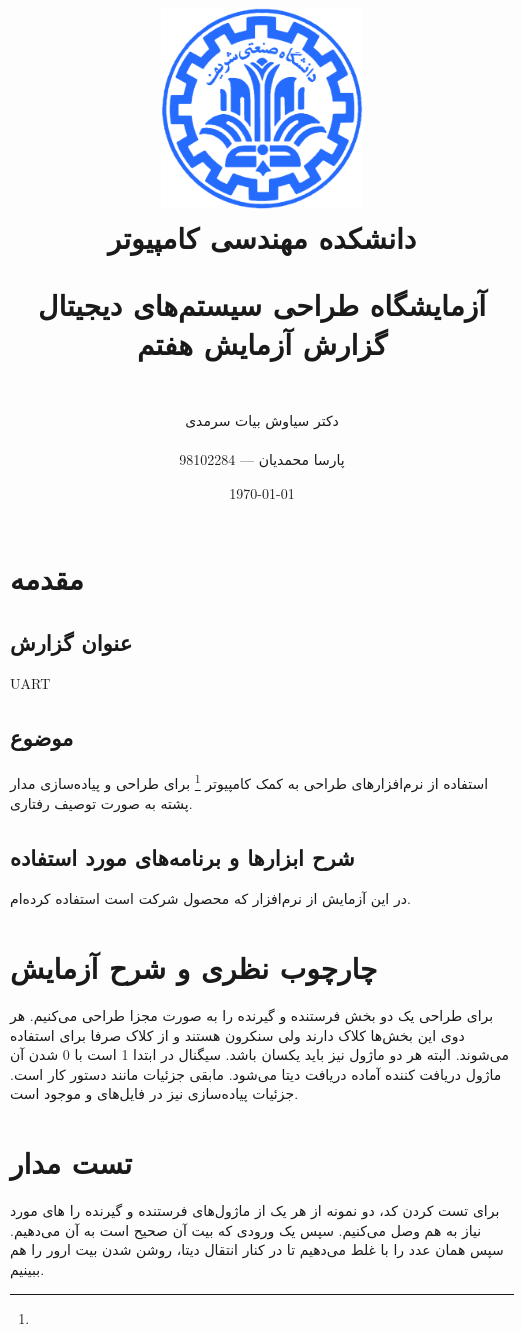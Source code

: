 \documentclass[fleqn]{article}
\title{
\includegraphics[width=0.4\textwidth]{sharif.png}\\
\normalsize{دانشکده مهندسی کامپیوتر}\\
\vspace{1cm}
	
\huge{آزمایشگاه طراحی سیستم‌های دیجیتال}
\\
\Large{گزارش آزمایش هفتم}
\\
}
\author{
\\
دکتر سیاوش بیات سرمدی
\\
\\
پارسا محمدیان --- 98102284
}
\date{\today}
\begin{document}
\clearpage\maketitle
\thispagestyle{empty}

\newpage

\pagestyle{fancy}



\tableofcontents

\setcounter{page}{1}

\newpage

\section{مقدمه}

\subsection*{عنوان گزارش}
UART
\subsection*{موضوع}
استفاده از نرم‌افزارهای طراحی به کمک کامپیوتر \footnote{} برای طراحی 
و پیاده‌سازی مدار پشته به صورت توصیف رفتاری.
\subsection*{شرح ابزارها و برنامه‌های مورد استفاده}
در این آزمایش از نرم‌افزار  که محصول شرکت  است 
استفاده کرده‌ام.

\section{چارچوب نظری و شرح آزمایش}
برای طراحی یک 
دو بخش فرستنده و گیرنده را به صورت مجزا طراحی می‌کنیم. هر دوی این بخش‌ها کلاک دارند ولی 
سنکرون هستند و از کلاک صرفا برای 
استفاده می‌شوند. البته 
هر دو ماژول نیز باید یکسان باشد. 
سیگنال 
در ابتدا 1 است با 0 شدن آن ماژول دریافت کننده آماده دریافت دیتا می‌شود. مابقی جزئیات مانند دستور کار است. 
جزئیات پیاده‌سازی نیز در فایل‌های 
و
موجود است.


\section{تست مدار}
برای تست کردن کد، دو نمونه از هر یک از ماژول‌های فرستنده و گیرنده را 
های مورد نیاز به هم وصل می‌کنیم. سپس یک ورودی که بیت 
آن صحیح است به آن می‌دهیم. سپس همان عدد را با 
غلط می‌دهیم تا در کنار انتقال دیتا، روشن شدن بیت ارور را هم ببینیم.
\end{document}
